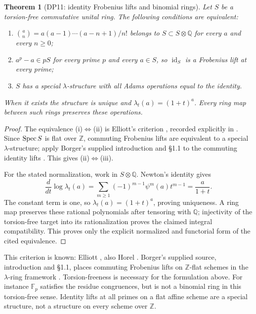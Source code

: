 \documentclass[11pt,a4paper]{article}
\newtheorem{theorem}{Theorem}[section]
\theoremstyle{definition}\newtheorem{remark}[theorem]{Remark}
\newcommand{\Z}{\mathbb Z}\newcommand{\Q}{\mathbb Q}\newcommand{\F}{\mathbb F}
\newcommand{\id}{\operatorname{id}}\newcommand{\Hom}{\operatorname{Hom}}
\begin{document}
\begin{theorem}[DP11: identity Frobenius lifts and binomial rings]\label{DP11}
Let $S$ be a torsion-free commutative unital ring. The following conditions are equivalent:
\begin{enumerate}[label=(\roman*)]
\item $\binom an=a(a-1)\cdots(a-n+1)/n!$ belongs to $S\subset S\otimes\Q$ for every $a$ and every $n\ge0$;
\item $a^p-a\in pS$ for every prime $p$ and every $a\in S$, so $\id_S$ is a Frobenius lift at every prime;
\item $S$ has a special $\lambda$-structure with all Adams operations equal to the identity.
\end{enumerate}
When it exists the structure is unique and $\lambda_t(a)=(1+t)^a$. Every ring map between such rings preserves these operations.
\end{theorem}
\begin{proof}
The equivalence (i)$\Leftrightarrow$(ii) is Elliott's criterion \cite[Theorem 4.1]{Elliott}, recorded explicitly in \cite[Remark 1.3]{Horel}. Since $\operatorname{Spec} S$ is flat over $\Z$, commuting Frobenius lifts are equivalent to a special $\lambda$-structure; apply Borger's supplied introduction and \S1.1 to the commuting identity lifts \cite{Borger}. This gives (ii)$\Leftrightarrow$(iii).

For the stated normalization, work in $S\otimes\Q$. Newton's identity gives
\[
 \frac{d}{dt}\log\lambda_t(a)
 =\sum_{m\ge1}(-1)^{m-1}\psi^m(a)t^{m-1}
 =\frac{a}{1+t}.
\]
The constant term is one, so $\lambda_t(a)=(1+t)^a$, proving uniqueness. A ring map preserves these rational polynomials after tensoring with $\Q$; injectivity of the torsion-free target into its rationalization proves the claimed integral compatibility. This proves only the explicit normalized and functorial form of the cited equivalence.
\end{proof}

This criterion is known: Elliott \cite[Theorem 4.1 and Proposition 8.3]{Elliott}, also Horel \cite[Definition 1.1 and Remark 1.3]{Horel}. Borger's supplied source, introduction and \S1.1, places commuting Frobenius lifts on $\Z$-flat schemes in the $\lambda$-ring framework \cite{Borger}. Torsion-freeness is necessary for the formulation above. For instance $\F_p$ satisfies the residue congruences, but is not a binomial ring in this torsion-free sense. Identity lifts at all primes on a flat affine scheme are a special structure, not a structure on every scheme over $\Z$.
\end{document}
